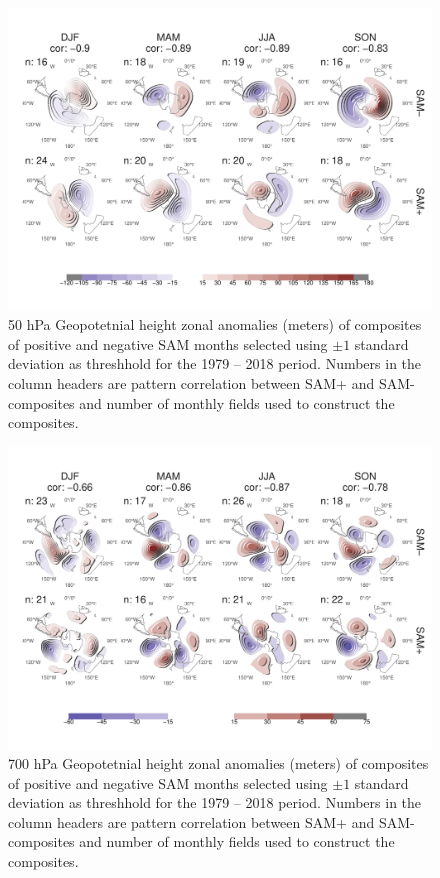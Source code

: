 \documentclass[]{ametsocV5}
\begin{document}
\begin{figure}
\includegraphics{A3-1} \caption[50 hPa Geopotetnial height zonal anomalies (meters) of composites of positive and negative SAM months selected using $\pm1$ standard deviation as threshhold for the 1979 -- 2018 period]{50 hPa Geopotetnial height zonal anomalies (meters) of composites of positive and negative SAM months selected using $\pm1$ standard deviation as threshhold for the 1979 -- 2018 period. Numbers in the column headers are pattern correlation between SAM+ and SAM- composites and number of monthly fields used to construct the composites.}\label{fig:A3}
\end{figure}

\begin{figure}
\includegraphics{A4-1} \caption[700 hPa Geopotetnial height zonal anomalies (meters) of composites of positive and negative SAM months selected using $\pm1$ standard deviation as threshhold for the 1979 -- 2018 period]{700 hPa Geopotetnial height zonal anomalies (meters) of composites of positive and negative SAM months selected using $\pm1$ standard deviation as threshhold for the 1979 -- 2018 period. Numbers in the column headers are pattern correlation between SAM+ and SAM- composites and number of monthly fields used to construct the composites.}\label{fig:A4}
\end{figure}
\end{document}
